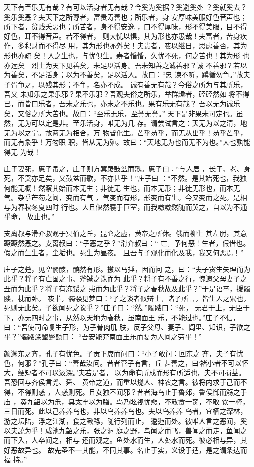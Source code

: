 \documentclass[a4paper,12pt,UTF8,twoside]{ctexbook}
\begin{document}
天下有至乐无有哉？有可以活身者无有哉？今奚为奚据？奚避奚处 ？奚就奚去？奚乐奚恶？夫天下之所尊者，富贵寿善也；所乐者，身 安厚味美服好色音声也；所下者，贫贱夭恶也；所苦者，身不得安逸 ，口不得厚味，形不得美服，目不得好色，耳不得音声。若不得者， 则大忧以惧，其为形也亦愚哉！夫富者，苦身疾作，多积财而不得尽 用，其为形也亦外矣！夫贵者，夜以继日，思虑善否，其为形也亦疏 矣！人之生也，与忧俱生。寿者惛惛，久忧不死，何之苦也！其为形 也亦远矣！烈士为天下见善矣，未足以活身。吾未知善之诚善邪？诚 不善邪？若以为善矣，不足活身；以为不善矣，足以活人。故曰：“忠 谏不听，蹲循勿争。”故夫子胥争之，以残其形；不争，名亦不成。 诚有善无有哉？今俗之所为与其所乐，吾又 未知乐之果乐邪？果不乐邪？吾观夫俗之所乐，举群趣者，硁硁然如 将不得已，而皆曰乐者，吾未之乐也，亦未之不乐也。果有乐无有哉？ 吾以无为诚乐矣，又俗之所大苦也。故曰：“至乐无乐，至誉无誉。” 天下是非果未可定也。虽然，无为可以定是非。至乐活身，唯无为几 存。请尝试言之：天无为以之清，地无为以之宁。故两无为相合，万 物皆化生。芒乎芴乎，而无从出乎！芴乎芒乎，而无有象乎！万物职 职，皆从无为殖。故曰：“天地无为也而无不为也。”人也孰能得无 为哉！

庄子妻死，惠子吊之，庄子则方箕踞鼓盆而歌。惠子曰：“与人居 ，长子、老、身死，不哭亦足矣，又鼓盆而歌，不亦甚乎！”庄子曰 ：“不然。是其始死也，我独何能无概！然察其始而本无生；非徒无 生也，而本无形；非徒无形也，而本无气。杂乎芒芴之间，变而有气 ，气变而有形，形变而有生。今又变而之死。是相与为春秋冬夏四时 行也。人且偃然寝于巨室，而我噭噭然随而哭之，自以为不通乎命， 故止也。”

支离叔与滑介叔观于冥伯之丘，昆仑之虚，黄帝之所休。俄而柳生 其左肘，其意蹶蹶然恶之。支离叔曰：“子恶之乎？”滑介叔曰：“ 亡，予何恶！生者，假借也。假之而生生者，尘垢也。死生为昼夜。 且吾与子观化而化及我，我又何恶焉！”

庄子之楚，见空髑髅，髐然有形。撽以马捶，因而问 之，曰：“夫子贪生失理而为此乎？将子有亡国之事、斧铖之诛而为 此乎？将子有不善之行，愧遗父母妻子之丑而为此乎？将子有冻馁之 患而为此乎？将子之春秋故及此乎？”于是语卒，援髑髅，枕而卧。 夜半，髑髅见梦曰：“子之谈者似辩士，诸子所言，皆生人之累也， 死则无此矣。子欲闻死之说乎？”庄子曰：“然。”髑髅曰：“死， 无君于上，无臣于下，亦无四时之事，从然以天地为春秋，虽南面王 乐，不能过也。”庄子不信，曰：“吾使司命复生子形，为子骨肉肌 肤，反子父母、妻子、闾里、知识，子欲之乎？”髑髅深颦蹙额曰： “吾安能弃南面王乐而复为人间之劳乎！”

颜渊东之齐，孔子有忧色。子贡下席而问曰：“小子敢问：回东之 齐，夫子有忧色，何邪？”孔子曰：“善哉汝问。昔者管子有言，丘 甚善之，曰‘褚小者不可以怀大，绠短者不可以汲深。’夫若是者， 以为命有所成而形有所适也，夫不可损益。吾恐回与齐侯言尧、舜、 黄帝之道，而重以燧人、神农之言。彼将内求于己而不得，不得则惑 ，人惑则死。且女独不闻邪？昔者海鸟止于鲁郊，鲁侯御而觞之于庙 ，奏九韶以为乐，具太牢以为膳。鸟乃眩视忧悲，不敢食一脔，不敢 饮一杯，三日而死。此以己养养鸟也，非以鸟养养鸟也。夫以鸟养养 鸟者，宜栖之深林，游之坛陆，浮之江湖，食之鳅鲦，随行列而止， 逶迤而处。彼唯人言之恶闻，奚以夫譊为乎！咸池九韶之乐，张之洞 庭之野，鸟闻之而飞，兽闻之而走，鱼闻之而下入，人卒闻之，相与 还而观之。鱼处水而生，人处水而死。彼必相与异，其好恶故异也。 故先圣不一其能，不同其事。名止于实，义设于适，是之谓条达而福 持。”
\end{document}
